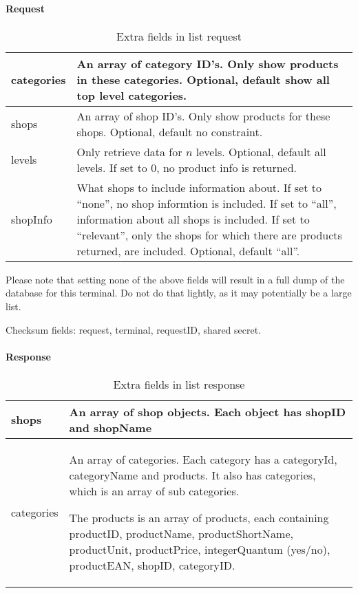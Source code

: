 \documentclass[a4paper,11pt]{article}
\newcommand{\code}[1]
   {\textsf{\mbox{#1}}}
\newcommand{\rightcellwidth}{25em}
\newcommand{\partsection}[1]
           {\paragraph{#1}}
\begin{document}
\partsection{Request}
\begin{table}[!ht]
  \begin{tabular}{|l|p{\rightcellwidth}|}
    \hline
     categories & An array of category ID's. Only show products in
                  these categories. Optional, default show all top level
                  categories.\\\hline 
     shops      & An array of shop ID's. Only show products for these
                  shops. Optional, default no constraint.  \\\hline
     levels     & Only retrieve data for $n$ levels. Optional, default all
                  levels. If set to 0, no product info is returned.\\\hline 
     shopInfo   & What shops to include information about. If set to
                  ``none'', no shop informtion is included. If set to
                  ``all'', information about all shops is included. If
                  set to ``relevant'', only the shops for which there
                  are products returned, are included. Optional,
                  default ``all''.  
  \end{tabular} 
  \caption{Extra fields in \code{list} request}
\end{table}

Please note that setting none of the above fields will result in a
full dump of the database for this terminal. Do not do that lightly,
as it may potentially be a large list. 

Checksum fields: request, terminal, requestID, shared secret.

\partsection{Response}
\begin{table}[!ht]
  \begin{tabular}{|l|p{\rightcellwidth}|}
    \hline
      shops & An array of shop objects. Each object has \code{shopID} and
             \code{shopName}\\\hline
      categories & An array of categories. Each category has a
                   \code{categoryId}, \code{categoryName} and \code{products}.
                   It also has \code{categories}, which is an array of sub
                   categories.

                   The \code{products} is an array of products, each containing
                   \code{productID}, \code{productName},
                   \code{productShortName}, \code{productUnit},
                   \code{productPrice}, \code{integerQuantum} (yes/no),
                   \code{productEAN}, \code{shopID}, \code{categoryID}. \\\hline
  \end{tabular} 
  \caption{Extra fields in \code{list} response}
\end{table}
\end{document}
